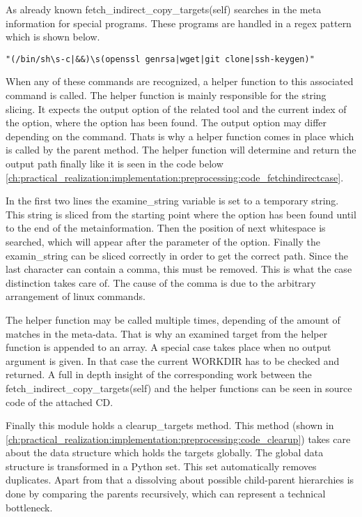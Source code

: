 As already known fetch\_indirect\_copy\_targets(self) searches in the meta information for special programs. These programs are handled in a regex pattern which is shown below.
\begin{lstlisting}
"(/bin/sh\s-c|&&)\s(openssl genrsa|wget|git clone|ssh-keygen)"
\end{lstlisting}
When any of these commands are recognized, a helper function to this associated command is called. The helper function is mainly responsible for the string slicing.
It expects the output option of the related tool and the current index of the option, where the option has been found. The output option may differ depending on the command. Thats is why a helper function comes in place which is called by the parent method. The helper function will determine and return the output path finally like it is seen in the code below \ref{ch:practical_realization:implementation:preprocessing:code_fetchindirectcase}.

In the first two lines the examine\_string variable is set to a temporary string. This string is sliced from the starting point where the option has been found until to the end of the metainformation.
Then the position of next whitespace is searched, which will appear after the parameter of the option. Finally the examin\_string can be sliced correctly in order to get the correct path. Since the last character can contain a comma, this must be removed. This is what the case distinction takes care of.
The cause of the comma is due to the arbitrary arrangement of linux commands.

The helper function may be called multiple times, depending of the amount of matches in the meta-data. That is why an examined target from the helper function is appended to an array. A special case takes place when no output argument is given. In that case the current WORKDIR has to be checked and returned.
A full in depth insight of the corresponding work between the fetch\_indirect\_copy\_targets(self) and the helper functions can be seen in source code of the attached CD.

Finally this module holds a clearup\_targets method. This method (shown in \ref{ch:practical_realization:implementation:preprocessing:code_clearup}) takes care about the data structure which holds the targets globally. The global data structure is transformed in a Python set. This set automatically removes duplicates. Apart from that a dissolving about possible child-parent hierarchies is done by comparing the parents recursively, which can represent a technical bottleneck. 

